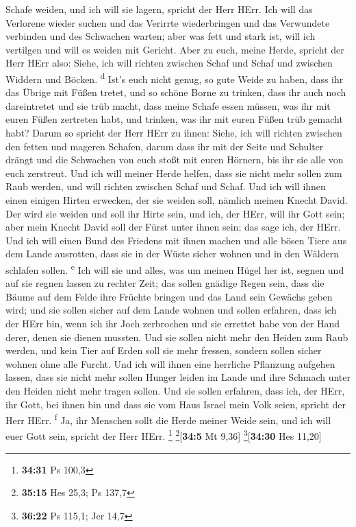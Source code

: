 Schafe weiden, und ich will sie lagern, spricht der Herr HErr.
 Ich will das Verlorene wieder suchen und das Verirrte
wiederbringen und das Verwundete verbinden und des Schwachen warten;
aber was fett und stark ist, will ich vertilgen und will es weiden mit
Gericht.  Aber zu euch, meine Herde, spricht der Herr
HErr also: Siehe, ich will richten zwischen Schaf und Schaf und zwischen
Widdern und Böcken. \textsuperscript{d}  Ist's euch nicht
genug, so gute Weide zu haben, dass ihr das Übrige mit Füßen tretet, und
so schöne Borne zu trinken, dass ihr auch noch dareintretet und sie trüb
macht,  dass meine Schafe essen müssen, was ihr mit euren
Füßen zertreten habt, und trinken, was ihr mit euren Füßen trüb gemacht
habt?  Darum so spricht der Herr HErr zu ihnen: Siehe,
ich will richten zwischen den fetten und mageren Schafen,
 darum dass ihr mit der Seite und Schulter drängt und die
Schwachen von euch stoßt mit euren Hörnern, bis ihr sie alle von euch
zerstreut.  Und ich will meiner Herde helfen, dass sie
nicht mehr sollen zum Raub werden, und will richten zwischen Schaf und
Schaf.  Und ich will ihnen einen einigen Hirten erwecken,
der sie weiden soll, nämlich meinen Knecht David. Der wird sie weiden
und soll ihr Hirte sein,  und ich, der HErr, will ihr
Gott sein; aber mein Knecht David soll der Fürst unter ihnen sein; das
sage ich, der HErr.  Und ich will einen Bund des Friedens
mit ihnen machen und alle bösen Tiere aus dem Lande ausrotten, dass sie
in der Wüste sicher wohnen und in den Wäldern schlafen sollen.
\textsuperscript{e}  Ich will sie und alles, was um
meinen Hügel her ist, segnen und auf sie regnen lassen zu rechter Zeit;
das sollen gnädige Regen sein,  dass die Bäume auf dem
Felde ihre Früchte bringen und das Land sein Gewächs geben wird; und sie
sollen sicher auf dem Lande wohnen und sollen erfahren, dass ich der
HErr bin, wenn ich ihr Joch zerbrochen und sie errettet habe von der
Hand derer, denen sie dienen mussten.  Und sie sollen
nicht mehr den Heiden zum Raub werden, und kein Tier auf Erden soll sie
mehr fressen, sondern sollen sicher wohnen ohne alle Furcht.
 Und ich will ihnen eine herrliche Pflanzung aufgehen
lassen, dass sie nicht mehr sollen Hunger leiden im Lande und ihre
Schmach unter den Heiden nicht mehr tragen sollen.  Und
sie sollen erfahren, dass ich, der HErr, ihr Gott, bei ihnen bin und
dass sie vom Haus Israel mein Volk seien, spricht der Herr HErr.
\textsuperscript{f}  Ja, ihr Menschen sollt die Herde
meiner Weide sein, und ich will euer Gott sein, spricht der Herr HErr.
\footnote{\textbf{34:31} Ps 100,3} \footnote{\textbf{35:15} Hes 25,3; Ps
  137,7}{[}\textbf{34:5} Mt 9,36{]} \footnote{\textbf{36:22} Ps 115,1;
  Jer 14,7}{[}\textbf{34:30} Hes 11,20{]}

